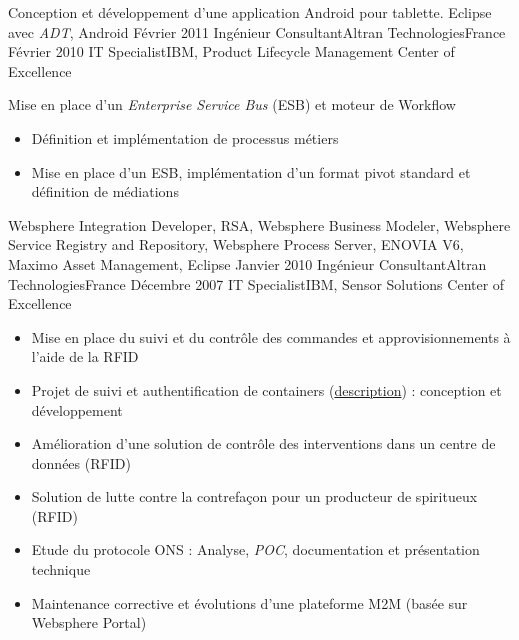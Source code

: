 \begin{experiences}
{                      Conception et développement d'une application Android pour tablette. 
                    }
                    {Eclipse avec \emph{ADT}, Android} 
  \emptySeparator   
  \consultantexperience
  {Février 2011}    {Ingénieur Consultant}{Altran Technologies}{France}
  {Février 2010}    {IT Specialist}{IBM, Product Lifecycle Management Center of Excellence}
                    {
                      Mise en place d'un \emph{Enterprise Service Bus} (ESB) et moteur de Workflow
                      \begin{itemize}
                        \item Définition et implémentation de processus métiers                           
                        \item Mise en place d'un ESB, implémentation d'un format pivot standard et définition de médiations
                      \end{itemize}
                    }
                    {
                      Websphere Integration Developer, RSA, Websphere Business Modeler, Websphere Service Registry and Repository, 
                      Websphere Process Server, ENOVIA V6, Maximo Asset Management, Eclipse
                    }   
  \emptySeparator            
  \consultantexperience
  {Janvier 2010}    {Ingénieur Consultant}{Altran Technologies}{France}
  {Décembre 2007}   {IT Specialist}{IBM, Sensor Solutions Center of Excellence}
                    {
                      \begin{itemize}
                        \item Mise en place du suivi et du contrôle des commandes et approvisionnements à l'aide de la RFID
                        \item Projet de suivi et authentification de containers (\href{http://www.container-centralen.co.uk/rfid/history.aspx}{description}) : conception et développement
                        \item Amélioration d'une solution de contrôle des interventions dans un centre de données (RFID)
                        \item Solution de lutte contre la contrefaçon pour un producteur de spiritueux (RFID)           
                        \item Etude du protocole ONS : Analyse, \emph{POC}, documentation et présentation technique     
                        \item Maintenance corrective et évolutions d'une plateforme M2M (basée sur Websphere Portal)    
                      \end{itemize}
}
\end{experiences}

